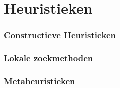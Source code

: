 \chapter{Heuristieken}

\subsection{Constructieve Heuristieken}

\subsection{Lokale zoekmethoden}

\subsection{Metaheuristieken}